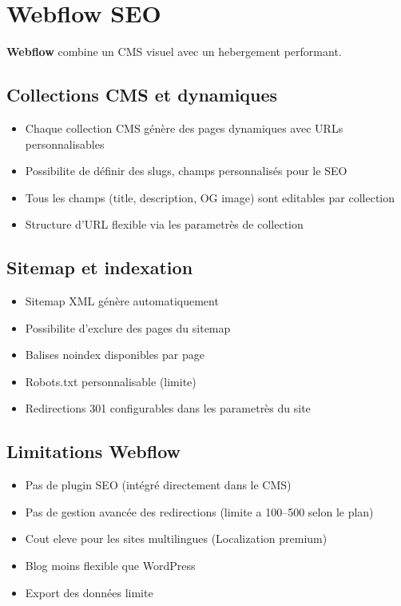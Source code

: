 \documentclass[12pt,a4paper,twoside]{report}
\newcommand{\keyword}[1]{\textbf{\textcolor{googleblue}{#1}}}
\begin{document}
\section{Webflow SEO}

\keyword{Webflow} combine un CMS visuel avec un hebergement performant.

\subsection{Collections CMS et dynamiques}

\begin{itemize}
    \item Chaque collection CMS génère des pages dynamiques avec URLs personnalisables
    \item Possibilite de définir des slugs, champs personnalisés pour le SEO
    \item Tous les champs (title, description, OG image) sont editables par collection
    \item Structure d'URL flexible via les parametrès de collection
\end{itemize}

\subsection{Sitemap et indexation}

\begin{itemize}
    \item Sitemap XML génère automatiquement
    \item Possibilite d'exclure des pages du sitemap
    \item Balises noindex disponibles par page
    \item Robots.txt personnalisable (limite)
    \item Redirections 301 configurables dans les parametrès du site
\end{itemize}

\subsection{Limitations Webflow}

\begin{itemize}
    \item Pas de plugin SEO (intégré directement dans le CMS)
    \item Pas de gestion avancée des redirections (limite a 100--500 selon le plan)
    \item Cout eleve pour les sites multilingues (Localization premium)
    \item Blog moins flexible que WordPress
    \item Export des données limite
\end{itemize}
\end{document}
